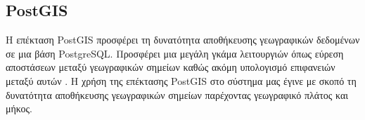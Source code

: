 \subsection{PostGIS}
Η επέκταση PostGIS προσφέρει τη δυνατότητα αποθήκευσης γεωγραφικών δεδομένων σε μια βάση PostgreSQL. Προσφέρει μια μεγάλη γκάμα λειτουργιών όπως εύρεση αποστάσεων μεταξύ γεωγραφικών σημείων καθώς ακόμη υπολογισμό επιφανειών μεταξύ αυτών \citep{postgis}. Η χρήση της επέκτασης PostGIS στο σύστημα μας έγινε με σκοπό τη δυνατότητα αποθήκευσης γεωγραφικών σημείων παρέχοντας γεωγραφικό πλάτος και μήκος.
